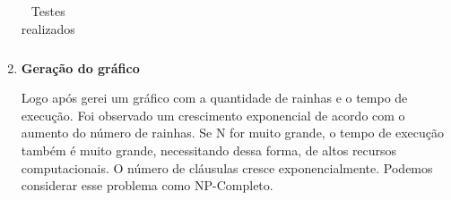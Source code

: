 \documentclass[11pt,a4paper]{article}
\begin{document}
\begin{enumerate}
\begin{table}[h]
{\begin{tabular}{ l l }
 \end{tabular} }
 \caption{Testes realizados}
\end{table}

\item \textbf{Geração do gráfico}

Logo após gerei um gráfico com a quantidade de rainhas e o tempo de execução. Foi observado um crescimento exponencial de acordo com o aumento do número de rainhas. Se N for muito grande, o tempo de execução também é muito grande, necessitando dessa forma, de altos recursos computacionais. O número de cláusulas cresce exponencialmente. Podemos considerar esse problema como NP-Completo.

{\par\centering
{}

\par}

\end{enumerate}
	
\end{document}
